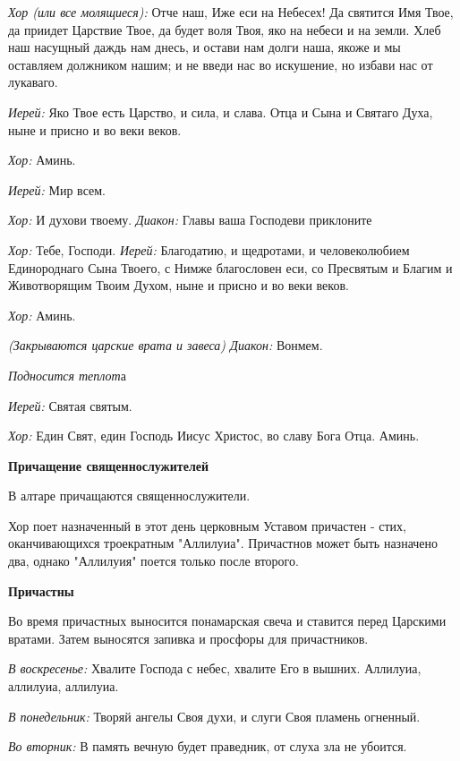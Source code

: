  {\itshape  Хор (или все молящиеся):} Отче наш, Иже еси на Небесех! Да святится Имя Твое, да приидет Царствие Твое, да будет воля Твоя, яко на небеси и на земли. Хлеб наш насущный даждь нам днесь, и остави нам долги наша, якоже и мы оставляем должником нашим; и не введи нас во искушение, но избави нас от лукаваго. 

 {\itshape  Иерей:} Яко Твое есть Царство, и сила, и слава. Отца и Сына и Святаго Духа, ныне и присно и во веки веков. 

{\itshape    Хор:} Аминь. 

{\itshape    Иерей:} Мир всем. 

{\itshape    Хор:} И духови твоему. {\itshape  Диакон:} Главы ваша Господеви приклоните

 {\itshape Хор:} Тебе, Господи. {\itshape  Иерей:} Благодатию, и щедротами, и человеколюбием Единороднаго Сына Твоего, с Нимже благословен еси, со Пресвятым и Благим и Животворящим Твоим Духом, ныне и присно и во веки веков. 

{\itshape    Хор:} Аминь. 

{\itshape  (Закрываются царские врата и завеса)   Диакон:} Вонмем. 

{\itshape    Подносится теплот}а 

{\itshape    Иерей:} Святая святым. 

 {\itshape  Хор:} Един Свят, един Господь Иисус Христос, во славу Бога Отца. Аминь.  

\medskip 

{\bfseries  Причащение священнослужителей }

   В алтаре причащаются священнослужители. 

 Хор поет назначенный в этот день церковным Уставом причастен - стих, оканчивающихся троекратным "Аллилуиа". Причастнов может быть назначено два, однако "Аллилуия" поется только после второго.  

\medskip 

{\bfseries  Причастны }

       Во время причастных выносится понамарская свеча и ставится перед Царскими вратами. Затем выносятся запивка и просфоры для причастников.

 {\itshape  В воскресенье:} Хвалите Господа с небес, хвалите Его в вышних. Аллилуиа, аллилуиа, аллилуиа. 

 {\itshape В понедельник:} Творяй ангелы Своя духи, и слуги Своя пламень огненный. 

 {\itshape Во вторник:} В память вечную будет праведник, от слуха зла не убоится. 

